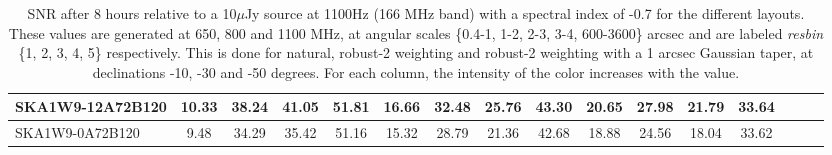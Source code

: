 \begin{table}[!htp]
{{\begin{tabular}{|lccccc||ccccc||ccccc|}
SKA1W9-12A72B120 & 10.33 \cellcolor{blue!60.00} & 38.24 \cellcolor{red!60.00} & 41.05 \cellcolor{green!60.00} & 51.81 \cellcolor{orange!26.03} & 16.66 \cellcolor{blue!60.00} & 32.48 \cellcolor{red!60.00} & 25.76 \cellcolor{green!60.00} & 43.30 \cellcolor{orange!27.57} & 20.65 \cellcolor{blue!60.00} & 27.98 \cellcolor{red!60.00} & 21.79 \cellcolor{green!60.00} & 33.64 \cellcolor{orange!18.33}\\ \hline 
SKA1W9-0A72B120 & 9.48 \cellcolor{blue!49.25} & 34.29 \cellcolor{red!47.14} & 35.42 \cellcolor{green!39.69} & 51.16 \cellcolor{orange!18.00} & 15.32 \cellcolor{blue!51.41} & 28.79 \cellcolor{red!45.97} & 21.36 \cellcolor{green!18.00} & 42.68 \cellcolor{orange!18.00} & 18.88 \cellcolor{blue!52.07} & 24.56 \cellcolor{red!44.35} & 18.04 \cellcolor{green!18.00} & 33.62 \cellcolor{orange!18.00}\tabularnewline \hline 
\end{tabular}}\hfil 

\caption{SNR after 8 hours relative to a 10$\mu$Jy source at 1100Hz (166 MHz band) with a spectral index of -0.7 for the different layouts. These values are generated at 650, 800 and 1100 MHz, at angular scales \{0.4-1, 1-2, 2-3, 3-4, 600-3600\} arcsec and are labeled {\it resbin} \{1, 2, 3, 4, 5\} respectively. This is done for natural, robust-2 weighting and robust-2 weighting with a 1 arcsec Gaussian taper, at declinations -10, -30 and -50 degrees. For each column, the intensity of the color increases with the value.}\label{tab:snr10}}
 \end{table}